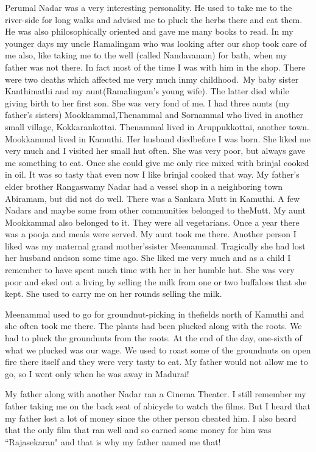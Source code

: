 Perumal Nadar was a very interesting personality. He used to take me to 
the river-side for long walks and advised me to pluck the herbs there 
and eat them. He was also philosophically oriented and gave me many 
books to read.
\vskip 1pt
In my younger days my uncle Ramalingam who was looking after our shop 
took care of me also, like taking me to the well (called Nandavanam) for 
bath, when my father was not there. In fact most of the time I was with 
him in the shop.
\vskip 1pt
There were two deaths which affected me very much in\break my childhood.\ My 
baby sister Kanthimathi and my aunt\break (Ramalingam's young wife). The 
latter died while giving birth to her first son. She was very fond of 
me.
\vskip 1pt
I had three aunts (my father's sisters) Mookkammal,\break Thenammal and 
Sornammal who lived in another small village, Kokkarankottai. Thenammal 
lived in Aruppukkottai, another town. Mookkammal lived in Kamuthi. Her 
husband died\break before I was born. She liked me very much and I visited her 
small hut often. She was very poor, but always gave me something to eat. 
Once she could give me only rice mixed with brinjal cooked in oil. It 
was so tasty that even now I like brinjal cooked that way. My father's 
elder brother Rangaswamy Nadar had a vessel shop in a neighboring town 
Abiramam, but did not do well.
\vskip 1pt
There was a Sankara Mutt in Kamuthi. A few Nadars and maybe some from 
other communities belonged to the\break Mutt. My aunt Mookkammal also belonged 
to it. They were all vegetarians. Once a year there was a pooja and 
meals were served. My aunt took me there.
\vskip 1pt
Another person I liked was my maternal grand mother's\break sister Meenammal. 
Tragically she had lost her husband and\break son some time ago. She liked me 
very much and as a child I remem\-ber to have spent much time with her in 
her humble hut. She was very poor and eked out a living by selling the 
milk from one or two buffaloes that she kept. She used to carry me on 
her rounds selling the milk.

Meenammal used to go for groundnut-picking in the\break fields north of 
Kamuthi and she often took me there. The plants had been plucked along 
with the roots. We had to pluck the groundnuts from the roots. At the 
end of the day, one-sixth of what we plucked was our wage. We used to 
roast some of the groundnuts on open fire there itself and they were 
very tasty to eat. My father would not allow me to go, so I went only 
when he was away in Madurai!

My father along with another Nadar ran a Cinema Theater. I still 
remember my father taking me on the back seat of a\break bicycle to watch the 
films. But I heard that my father lost a lot of money since the other 
person cheated him. I also heard that the only film that ran well and so 
earned some money for him was ``Rajasekaran" and that is why my father 
named me that!

